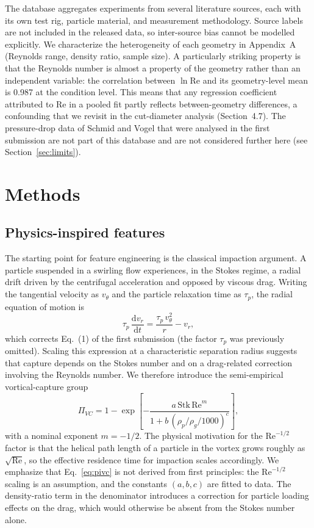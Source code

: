 \documentclass[12pt]{article}
\newcommand{\Stk}{\mathrm{Stk}}
\newcommand{\Rey}{\mathrm{Re}}
\newcommand{\PiVC}{\Pi_{VC}}
\begin{document}
The database aggregates experiments from several literature sources, each with its own test rig, particle material, and measurement methodology. Source labels are not included in the released data, so inter-source bias cannot be modelled explicitly. We characterize the heterogeneity of each geometry in Appendix~A (Reynolds range, density ratio, sample size). A particularly striking property is that the Reynolds number is almost a property of the geometry rather than an independent variable: the correlation between $\ln\Rey$ and its geometry-level mean is 0.987 at the condition level. This means that any regression coefficient attributed to Re in a pooled fit partly reflects between-geometry differences, a confounding that we revisit in the cut-diameter analysis (Section~4.7). The pressure-drop data of Schmid and Vogel that were analysed in the first submission are not part of this database and are not considered further here (see Section~\ref{sec:limits}).

\section{Methods}

\subsection{Physics-inspired features}
\label{sec:pivc}

The starting point for feature engineering is the classical impaction argument. A particle suspended in a swirling flow experiences, in the Stokes regime, a radial drift driven by the centrifugal acceleration and opposed by viscous drag. Writing the tangential velocity as $v_\theta$ and the particle relaxation time as $\tau_p$, the radial equation of motion is
\begin{equation}
\tau_p\,\frac{\mathrm{d}v_r}{\mathrm{d}t} = \frac{\tau_p\, v_\theta^2}{r} - v_r,
\label{eq:eom}
\end{equation}
which corrects Eq.~(1) of the first submission (the factor $\tau_p$ was previously omitted). Scaling this expression at a characteristic separation radius suggests that capture depends on the Stokes number and on a drag-related correction involving the Reynolds number. We therefore introduce the semi-empirical vortical-capture group
\begin{equation}
\PiVC = 1 - \exp\!\left[-\frac{a\,\Stk\,\Rey^{m}}{1 + b\,(\rho_p/\rho_g / 1000)^{c}}\right],
\label{eq:pivc}
\end{equation}
with a nominal exponent $m = -1/2$. The physical motivation for the $\Rey^{-1/2}$ factor is that the helical path length of a particle in the vortex grows roughly as $\sqrt{\Rey}$, so the effective residence time for impaction scales accordingly. We emphasize that Eq.~\eqref{eq:pivc} is not derived from first principles: the $\Rey^{-1/2}$ scaling is an assumption, and the constants $(a, b, c)$ are fitted to data. The density-ratio term in the denominator introduces a correction for particle loading effects on the drag, which would otherwise be absent from the Stokes number alone.
\end{document}
